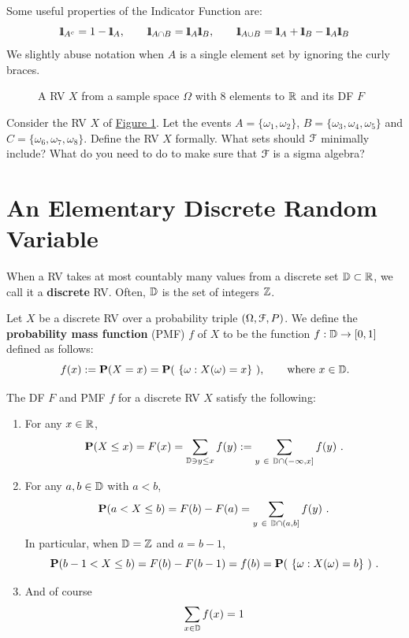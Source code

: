 Some useful properties of the Indicator Function are:
\[
\BB{1}_{A^c} = 1 - \BB{1}_A, \qquad \BB{1}_{A \cap B} = \BB{1}_A \BB{1}_B, \qquad \BB{1}_{A \cup B} = \BB{1}_A + \BB{1}_B - \BB{1}_A \BB{1}_B
\]
We slightly abuse notation when $A$ is a single element set by ignoring the curly braces.
\begin{figure}[htpb]
\caption{A RV $X$ from a sample space $\Omega$ with $8$ elements to $\mathbb{R}$ and its DF $F$ \label{F:RVABC}}
\centering   {}
\end{figure}
\begin{classwork}
Consider the RV $X$ of \hyperref[F:RVABC]{Figure \ref*{F:RVABC}}.  Let the events $A = \{\omega_1, \omega_2\}$, $B = \{\omega_3, \omega_4, \omega_5\}$ and $C = \{\omega_6, \omega_7,\omega_8 \}$.  Define the RV $X$ formally.  What sets should $\mathcal{F}$ minimally include?  What do you need to do to make sure that $\mathcal{F}$ is a sigma algebra?
\vspace{4cm}
\end{classwork}

\section{An Elementary Discrete Random Variable}\label{S:ElemDiscRV}

When a RV takes at most countably many values from a discrete set $\mathbb{D} \subset \mathbb{R}$, we call it a {\bf discrete} RV.  Often, $\mathbb{D}$ is the set of integers $\mathbb{Z}$.
\begin{definition}
Let $X$ be a discrete RV over a probability triple $(\Omega, \mathcal{F},P)$.  We define the {\bf probability mass function} (PMF) $f$ of $X$ to be the function $f : \mathbb{D} \rightarrow [0,1]$ defined as follows:
\[
f(x) := \mathbf{P}(X=x) = \mathbf{P}( \ \{\omega: X(\omega) = x\} \ ), \qquad \text{where $x \in \mathbb{D}$.} 
\]
\end{definition}
The DF $F$ and PMF $f$ for a discrete RV $X$ satisfy the following:
\begin{enumerate}
\item  For any $x \in \mathbb{R}$,
\[
\mathbf{P}(X \leq x) = F(x) = \sum_{\mathbb{D} \ni y \leq x} f(y) := 
\sum_{y \ \in \  \mathbb{D} \cap (-\infty, x] } f(y) \ .
\]
\item For any $a,b \in \mathbb{D}$ with $a<b$,
\[
\mathbf{P}(a < X \leq b) = F(b) - F(a) = \sum_{y \ \in \  \mathbb{D} \cap (a, b] } f(y) \ .
\]
In particular, when $\mathbb{D}=\mathbb{Z}$ and $a=b-1$,
\[
\mathbf{P}(b-1 < X \leq b) = F(b) - F(b-1) = f(b) = \mathbf{P}( \ \{ \omega : X(\omega) = b\} \ ) \ .
\]
\item And of course
\[
\sum_{x \in \mathbb{D}} f(x) = 1
\]
\end{enumerate}

